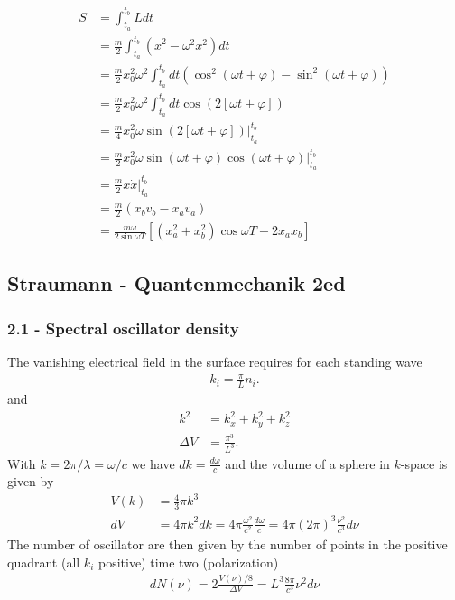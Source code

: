 \documentclass[10pt,a4paper]{article}
\theoremstyle{definition}
\begin{document}
\begin{align}
    S&=\int_{t_a}^{t_b}L dt\\
    &=\frac{m}{2}\int_{t_a}^{t_b}(\dot x^2-\omega^2x^2) dt\\
    &=\frac{m}{2}x_0^2\omega^2\int_{t_a}^{t_b}dt\left(\cos^2(\omega t+\varphi)-\sin^2(\omega t+\varphi)\right)\\
    &=\frac{m}{2}x_0^2\omega^2\int_{t_a}^{t_b}dt\cos(2[\omega t+\varphi])\\
    &=\frac{m}{4}x_0^2\omega\sin(2[\omega t+\varphi])|_{t_a}^{t_b}\\
    &=\frac{m}{2}x_0^2\omega\sin(\omega t+\varphi)\cos(\omega t+\varphi)|_{t_a}^{t_b}\\
    &=\frac{m}{2} x \dot x|_{t_a}^{t_b}\\
    &=\frac{m}{2}(x_bv_b-x_av_a)\\
    &=\frac{m\omega}{2\sin\omega T}\left[(x_a^2+x_b^2)\cos\omega T-2x_ax_b\right]
\end{align}

\subsection{{\sc Straumann} - Quantenmechanik 2ed}
\subsubsection{2.1 - Spectral oscillator density}
The vanishing electrical field in the surface requires for each standing wave
\begin{align}
    k_i=\frac{\pi}{L}n_i. 
\end{align}
and
\begin{align}
    k^2&=k_x^2+k_y^2+k_z^2\\
    \Delta V&=\frac{\pi^3}{L^3}.
\end{align}
With $k=2\pi/\lambda = \omega/c$ we have $dk=\frac{d\omega}{c}$ and the volume of a sphere in $k$-space is given by
\begin{align}
    V(k)&=\frac{4}{3}\pi k^3\\
    dV&=4\pi k^2 dk=4\pi \frac{\omega^2}{c^2} \frac{d\omega}{c} 
    =4\pi (2\pi)^3\frac{\nu^2}{c^3} d\nu 
\end{align}
The number of oscillator are then given by the number of points in the positive quadrant (all $k_i$ positive) time two (polarization)
\begin{align}
    dN(\nu)=2\frac{V(\nu)/8}{\Delta V}=L^3 \frac{8\pi}{c^3}\nu^2d\nu
\end{align}
\end{document}
